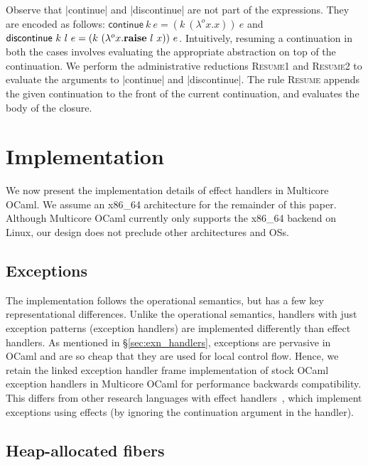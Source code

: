\documentclass[sigplan,screen]{acmart}
\newcommand{\olam}[2]{\lambda^o #1. #2}
\newcommand{\kw}[1]{\text{\bf #1}}
\newcommand{\throw}[2]{\kw{raise} ~#1 ~#2}
\begin{document}
Observe that |continue| and |discontinue| are not part of the expressions. They
are encoded as follows: $\textsf{continue} ~k ~e = (k ~(\olam{x}{x})) ~e$ and
$\textsf{discontinue} ~k ~l ~e = (k ~(\olam{x}{\throw{l}{x}})) ~e$.
Intuitively, resuming a continuation in both the cases involves evaluating the
appropriate abstraction on top of the continuation. We perform the
administrative reductions \textsc{Resume1} and \textsc{Resume2} to evaluate the
arguments to |continue| and |discontinue|. The rule \textsc{Resume} appends the
given continuation to the front of the current continuation, and evaluates the
body of the closure.

\section{Implementation}
\label{sec:impl}

We now present the implementation details of effect handlers in Multicore
OCaml. We assume an x86\_64 architecture for the remainder of this paper.
Although Multicore OCaml currently only supports the x86\_64 backend on Linux,
our design does not preclude other architectures and OSs.

\subsection{Exceptions}

The implementation follows the operational semantics, but has a few key
representational differences. Unlike the operational semantics, handlers with
just exception patterns (exception handlers) are implemented differently than
effect handlers. As mentioned in \S\ref{sec:exn_handlers}, exceptions are
pervasive in OCaml and are so cheap that they are used for local control flow.
Hence, we retain the linked exception handler frame implementation of stock
OCaml exception handlers in Multicore OCaml for performance backwards
compatibility. This differs from other research languages with effect
handlers~\cite{Hillerstrom20,Frank,Eff}, which implement exceptions using
effects (by ignoring the continuation argument in the handler).

\subsection{Heap-allocated fibers}
\label{sec:hafibers}
\end{document}
